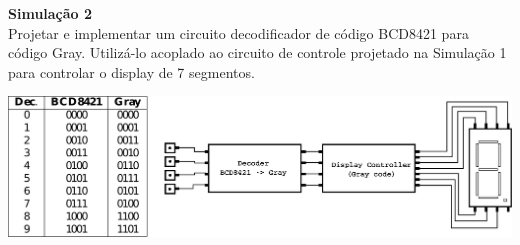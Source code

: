\documentclass{article}
\newcommand{\titulo}[1]{{\bf #1}}
\begin{document}
\vspace{3mm}
\noindent
\titulo{\large Simulação 2} \\
Projetar e implementar um circuito decodificador de código BCD8421 para código Gray.
Utilizá-lo acoplado ao circuito de controle projetado na Simulação 1 para controlar o display de 7 segmentos.
\\
\begin{center}
\includegraphics[scale=0.3]{sim2}
\end{center}
\end{document}
